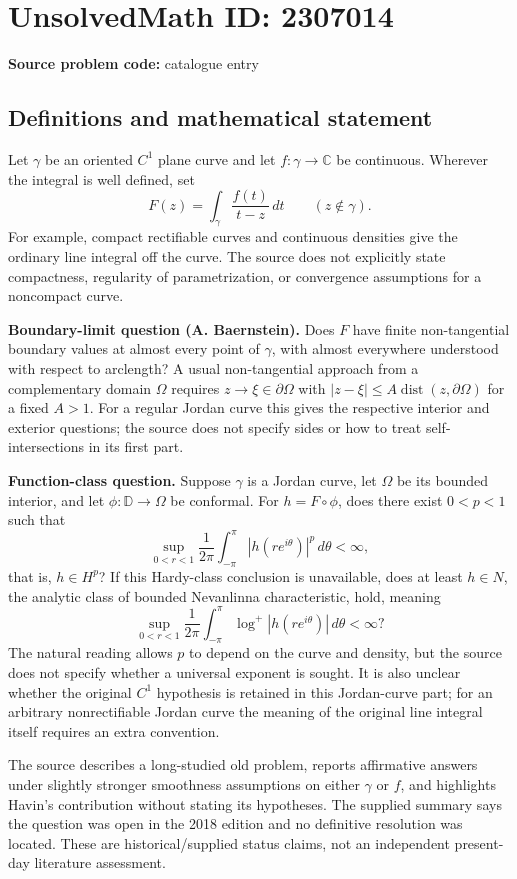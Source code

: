\documentclass[11pt]{article}
\newcommand{\C}{\mathbb{C}}
\begin{document}
\section*{UnsolvedMath ID: 2307014}
\textbf{Source problem code:} catalogue entry
\subsection{Definitions and mathematical statement}
Let $\gamma$ be an oriented $C^1$ plane curve and let $f:\gamma\to\C$ be continuous. Wherever the integral is well defined, set
\[
 F(z)=\int_\gamma\frac{f(t)}{t-z}\,dt\qquad(z\notin\gamma).
\]
For example, compact rectifiable curves and continuous densities give the ordinary line integral off the curve. The source does not explicitly state compactness, regularity of parametrization, or convergence assumptions for a noncompact curve.

\textbf{Boundary-limit question (A. Baernstein).} Does $F$ have finite non-tangential boundary values at almost every point of $\gamma$, with almost everywhere understood with respect to arclength? A usual non-tangential approach from a complementary domain $\Omega$ requires $z\to\xi\in\partial\Omega$ with $|z-\xi|\leq A\operatorname{dist}(z,\partial\Omega)$ for a fixed $A>1$. For a regular Jordan curve this gives the respective interior and exterior questions; the source does not specify sides or how to treat self-intersections in its first part.

\textbf{Function-class question.} Suppose $\gamma$ is a Jordan curve, let $\Omega$ be its bounded interior, and let $\phi:\mathbb D\to\Omega$ be conformal. For $h=F\circ\phi$, does there exist $0<p<1$ such that
\[
 \sup_{0<r<1}\frac1{2\pi}\int_{-\pi}^{\pi}|h(re^{i\theta})|^p\,d\theta<\infty,
\]
that is, $h\in H^p$? If this Hardy-class conclusion is unavailable, does at least $h\in N$, the analytic class of bounded Nevanlinna characteristic, hold, meaning
\[
 \sup_{0<r<1}\frac1{2\pi}\int_{-\pi}^{\pi}\log^+|h(re^{i\theta})|\,d\theta<\infty?
\]
The natural reading allows $p$ to depend on the curve and density, but the source does not specify whether a universal exponent is sought. It is also unclear whether the original $C^1$ hypothesis is retained in this Jordan-curve part; for an arbitrary nonrectifiable Jordan curve the meaning of the original line integral itself requires an extra convention.

The source describes a long-studied old problem, reports affirmative answers under slightly stronger smoothness assumptions on either $\gamma$ or $f$, and highlights Havin's contribution without stating its hypotheses. The supplied summary says the question was open in the 2018 edition and no definitive resolution was located. These are historical/supplied status claims, not an independent present-day literature assessment.
\end{document}

